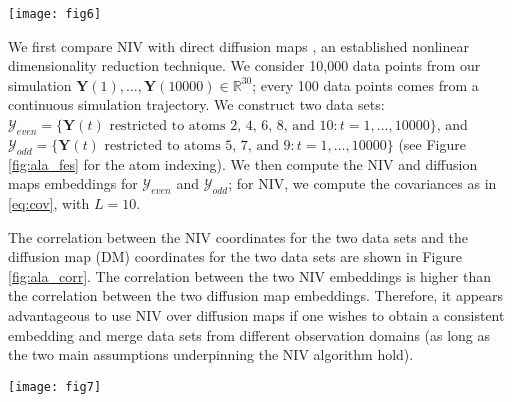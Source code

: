 \documentclass[aip,jcp,preprint]{revtex4-1}
\begin{document}
\begin{figure*}[ht]
    \texttt{[image: fig6]}
    \caption{(a) Free energy surface for Ala2. The relevant minima are labeled A, B, and C, and the corresponding molecular configurations are shown.
    (b) Sample representative molecular structure of Ala2, excluding the hydrogens. The atoms are numbered and the two dihedral angles $\phi$ and $\psi$ are indicated.}
    \label{fig:ala_fes}
\end{figure*}


We first compare NIV with direct diffusion maps \cite{coifman2005geometric}, an established nonlinear dimensionality reduction technique.
%
We consider 10,000 data points from our simulation $\mathbf{Y}(1), \dots, \mathbf{Y}(10000) \in \mathbb{R}^{30}$; every 100 data points comes from a continuous simulation trajectory.
%
We construct two data sets:
%
$\mathcal{Y}_{even} = \{\mathbf{Y}(t) \text{ restricted to atoms 2, 4, 6, 8, and 10}: t=1, \dots, 10000 \}$,
and $\mathcal{Y}_{odd} = \{\mathbf{Y}(t) \text{ restricted to atoms 5, 7, and 9}: t=1, \dots, 10000 \}$ (see Figure \ref{fig:ala_fes} for the atom indexing).
%
We then compute the NIV and diffusion maps embeddings for $\mathcal{Y}_{even}$ and $\mathcal{Y}_{odd}$;
for NIV, we compute the covariances as in \eqref{eq:cov}, with $L=10$.

The correlation between the NIV coordinates for the two data sets and the diffusion map (DM) coordinates for the two data sets are shown in Figure \ref{fig:ala_corr}.
%
The correlation between the two NIV embeddings is higher than the correlation between the two diffusion map embeddings.
Therefore, it appears advantageous to use NIV over diffusion maps if one wishes to obtain a consistent embedding and merge data sets from different observation domains (as long as the two main assumptions underpinning the NIV algorithm hold).

\begin{figure*}[ht]
    \texttt{[image: fig7]}
    \caption{(a) Correlation between the second NIV computed using the atoms 2, 4, 6, 8, and 10 ($\psi_2^{even}$) and the second NIV computed using atoms 5, 7, and 9 ($\psi_2^{odd}$). 
    (b) Correlation between the second DM computed using the atoms 2, 4, 6, 8, and 10 ($DM_2^{even}$) and the second DM computed using atoms 5, 7, and 9 ($DM_2^{odd}$).
    The correlations for the first (not shown) and second NIV coordinates are found to be 0.62 and 0.84, respectively.
    The correlations for the first (not shown) and second DM coordinates are found to be 0.54 and 0.60, respectively. }
    \label{fig:ala_corr}
\end{figure*}
\end{document}
